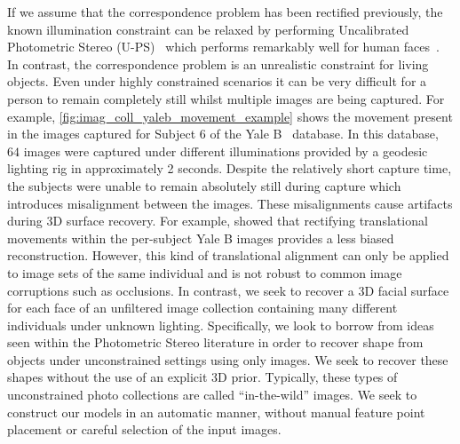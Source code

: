If we assume that the correspondence problem has been rectified previously,
the known illumination constraint can be relaxed by performing
Uncalibrated Photometric Stereo (U-PS)~\cite{hayakawa1994photometric,%
basri2007photometric} which performs remarkably well for
human faces~\cite{georghiades2001fromfew,KemelmacherShlizerman:2013iv,%
kemelmacher2011face,kemelmacher2012collection}.
In contrast, the correspondence problem is an
unrealistic constraint for living objects. Even under highly constrained
scenarios it can be very difficult for a person to remain completely still
whilst multiple images are being captured.
For example, \cref{fig:imag_coll_yaleb_movement_example} shows the movement
present in the images captured for Subject 6 of the
Yale B~\cite{georghiades2001fromfew} database. In this database, $64$ images
were captured under different illuminations provided by a geodesic lighting rig in
approximately 2 seconds. Despite the relatively short capture time, the subjects
were unable to remain absolutely still during capture which introduces
misalignment between the images. These misalignments cause artifacts
during 3D surface recovery.
For example, \citet{harrison2012translational} showed that rectifying
translational movements within the per-subject Yale B images provides a less
biased reconstruction. However, this kind of translational alignment can only
be applied to image sets of the same individual and is not robust to common
image corruptions such as occlusions. In contrast, we seek to recover a 3D
facial surface for each face of an unfiltered image collection containing
many different individuals under unknown lighting.
Specifically, we look to borrow from ideas seen within the Photometric Stereo
literature in order to recover shape from objects under unconstrained settings
using only images. We seek to recover these shapes without the use of an explicit
3D prior. Typically, these types of unconstrained
photo collections are called ``in-the-wild'' images. We seek to construct our
models in an automatic manner, without manual feature point placement or
careful selection of the input images.
